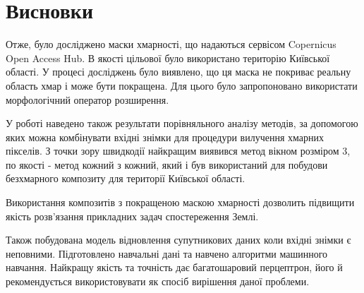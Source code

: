 \chapter{Висновки}

Отже, було досліджено маски хмарності, що надаються сервісом Copernicus Open Access Hub. В якості цільової було використано територію Київської області. У процесі досліджень було виявлено, що ця маска не покриває реальну область хмар і може бути покращена. Для цього було запропоновано використати морфологічний оператор розширення.

У роботі наведено також результати порівняльного аналізу методів, за допомогою яких можна комбінувати вхідні знімки для процедури вилучення хмарних пікселів. З точки зору швидкодії найкращим виявився метод вікном розміром 3, по якості - метод кожний з кожний, який і був використаний для побудови безхмарного композиту для території Київської області.

Використання композитів з покращеною маскою хмарності дозволить підвищити якість розв’язання прикладних задач спостереження Землі.

Також побудована модель відновлення супутникових даних коли вхідні знімки є неповними. Підготовлено навчальні дані та навчено алгоритми машинного навчання. Найкращу якість та точність дає багатошаровий перцептрон, його й рекомендується використовувати як спосіб вирішення даної проблеми.
